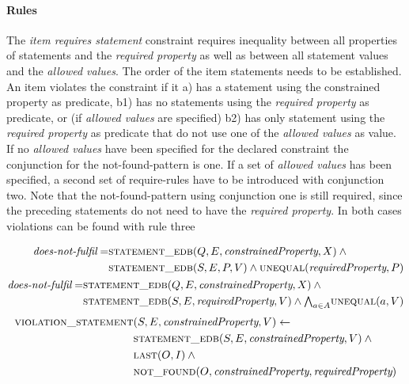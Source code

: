 \documentclass[hyperref,bachelorofscience,fleqn]{cgvpub}
\begin{document}
\paragraph{Rules}
The \emph{item requires statement} constraint requires inequality between all properties of statements and the \emph{required property} as well as between all statement values and the \emph{allowed values}. The order of the item statements needs to be established. An item violates the constraint if it a) has a statement using the constrained property as predicate, b1) has no statements using the \emph{required property} as predicate, or (if \emph{allowed values} are specified) b2) has only statement using the \emph{required property} as predicate that do not use one of the \emph{allowed values} as value. If no \emph{allowed values} have been specified for the declared constraint the conjunction for the not-found-pattern is one. If a set of \emph{allowed values} has been specified, a second set of require-rules have to be introduced with conjunction two. Note that the not-found-pattern using conjunction one is still required, since the preceding statements do not need to have the \emph{required property}. In both cases violations can be found with rule three

\begin{align}
\begin{split}
\emph{does-not-fulfil} = &\textsc{statement\_edb}(Q, E, \emph{constrainedProperty}, X) \wedge{} \\
&\textsc{statement\_edb}(S, E, P, V) \wedge \textsc{unequal}(\emph{requiredProperty}, P)
\end{split} \\
\begin{split}
\emph{does-not-fulfil} = &\textsc{statement\_edb}(Q, E, \emph{constrainedProperty}, X) \wedge{} \\
&\textsc{statement\_edb}(S, E, \emph{requiredProperty}, V) \wedge {\textstyle\bigwedge}_{a \in A} \textsc{unequal}(a, V)
\end{split}
\end{align}
\begin{align}
\begin{split}
\textsc{violation\_statement}&(S, E, \emph{constrainedProperty}, V) \leftarrow \\
&\textsc{statement\_edb}(S, E, \emph{constrainedProperty}, V) \wedge{} \\
&\textsc{last}(O, I) \wedge{} \\
&\textsc{not\_found}(O, \emph{constrainedProperty}, \emph{requiredProperty})
\end{split}
\end{align}
\end{document}
